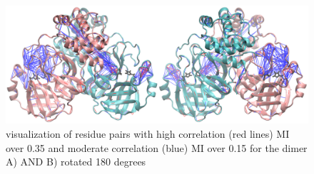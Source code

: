 \documentclass{biophys-new}
\begin{document}
\begin{figure}[ht]
\centering
\graphicspath{ {./supplemental_figures/} }
\includegraphics[width=0.6\linewidth]{dimer_MI_image.pdf}
\caption{visualization of residue pairs with high correlation (red lines) MI over 0.35 and moderate correlation (blue) MI over 0.15 for the dimer A) AND B) rotated 180 degrees}
\label{fig:view}
\end{figure}
\end{document}

